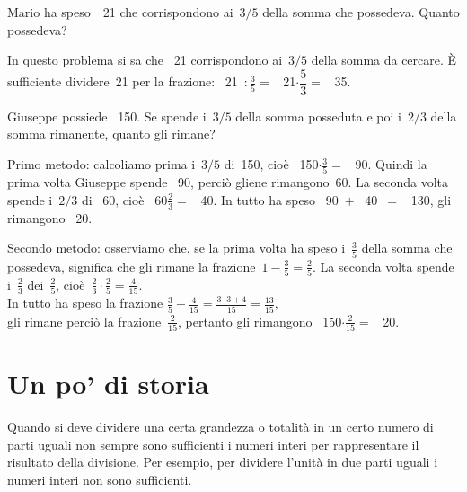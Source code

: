 \begin{esempio}
Mario ha speso~\officialeuro\ 21 che corrispondono ai~\(3/5\) della somma
che possedeva. Quanto possedeva?

In questo problema si sa che \officialeuro\ 21 corrispondono ai~\(3/5\) della
somma da cercare.
È sufficiente dividere~21 per la frazione:
\officialeuro\ 21~\(\displaystyle:\frac{3}{5}=\) \officialeuro\
21\(\cdot\dfrac{5}{3}=\) \officialeuro\ 35.
 \end{esempio}

 \begin{esempio}
Giuseppe possiede \officialeuro\ 150. Se spende i~\(3/5\) della somma
posseduta e
poi i~\(2/3\) della somma rimanente, quanto gli rimane?

Primo metodo: calcoliamo prima i~\(3/5\) di~150, cioè \officialeuro\
150\(\cdot\frac{3}{5}=\)
\officialeuro\ 90.
Quindi la prima volta Giuseppe spende \officialeuro\ 90, perciò gliene
rimangono~60. La seconda volta spende i~\(2/3\) di \officialeuro\ 60,
cioè \officialeuro\ 60\(\frac{2}{3}=\) \officialeuro\ 40. In tutto ha speso
\officialeuro\ 90~\(+\) \officialeuro\ 40~\(=\) \officialeuro\ 130, gli
rimangono \officialeuro\ 20.

Secondo metodo: osserviamo che,
se la prima volta ha speso i~\(\frac{3}{5}\) della somma che possedeva,
significa che gli rimane la frazione~\(1-\frac{3}{5}=\frac{2}{5}\).
La seconda volta spende i~\(\frac{2}{3}\) dei~\(\frac{2}{5}\),
cioè~\(\frac{2}{3} \cdot \frac{2}{5} = \frac{4}{15}\).\\
In tutto ha speso la frazione \quad
\(\frac{3}{5}+\frac{4}{15}=\frac{3\cdot3+4}{15}=\frac{13}{15},\)\\
gli rimane perciò la frazione~\(\frac{2}{15}\), pertanto gli rimangono
\officialeuro\ 150\(\cdot\frac{2}{15}=\) \officialeuro\ 20.
 \end{esempio}


\newpage %

\section{Un po' di  storia}

Quando si deve dividere una certa grandezza o totalità in un certo numero di
parti uguali non sempre sono sufficienti i numeri interi per rappresentare
il risultato della divisione. Per esempio, per dividere l'unità in due parti
uguali i numeri interi non sono sufficienti.

